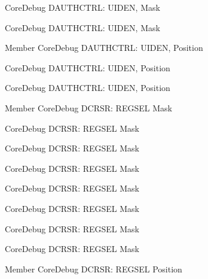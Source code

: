 \begin{DoxyRefList}
\label{deprecated__deprecated000080}%
%
Core\+Debug DAUTHCTRL\+: UIDEN, Mask 

\label{deprecated__deprecated000633}%
%
Core\+Debug DAUTHCTRL\+: UIDEN, Mask  
\item[Member \doxylink{group__CMSIS__SCB_gab9cb997565a842f5eb9365bd58d7cda2}{Core\+Debug\+\_\+\+DAUTHCTRL\+\_\+\+UIDEN\+\_\+\+Pos} ]\label{deprecated__deprecated000530}%
%
Core\+Debug DAUTHCTRL\+: UIDEN, Position 

\label{deprecated__deprecated000079}%
%
Core\+Debug DAUTHCTRL\+: UIDEN, Position 

\label{deprecated__deprecated000632}%
%
Core\+Debug DAUTHCTRL\+: UIDEN, Position  
\item[Member \doxylink{group__CMSIS__CoreDebug_ga17cafbd72b55030219ce5609baa7c01d}{Core\+Debug\+\_\+\+DCRSR\+\_\+\+REGSEL\+\_\+\+Msk} ]\label{deprecated__deprecated000188}%
%
Core\+Debug DCRSR\+: REGSEL Mask 

\label{deprecated__deprecated000044}%
%
Core\+Debug DCRSR\+: REGSEL Mask 

\label{deprecated__deprecated000271}%
%
Core\+Debug DCRSR\+: REGSEL Mask 

\label{deprecated__deprecated000330}%
%
Core\+Debug DCRSR\+: REGSEL Mask 

\label{deprecated__deprecated000495}%
%
Core\+Debug DCRSR\+: REGSEL Mask 

\label{deprecated__deprecated000132}%
%
Core\+Debug DCRSR\+: REGSEL Mask 

\label{deprecated__deprecated000597}%
%
Core\+Debug DCRSR\+: REGSEL Mask 

\label{deprecated__deprecated000406}%
%
Core\+Debug DCRSR\+: REGSEL Mask  
\item[Member \doxylink{group__CMSIS__CoreDebug_ga52182c8a9f63a52470244c0bc2064f7b}{Core\+Debug\+\_\+\+DCRSR\+\_\+\+REGSEL\+\_\+\+Pos} ]\label{deprecated__deprecated000494}%
%
Core\+Debug DCRSR\+: REGSEL Position 


\end{DoxyRefList}
